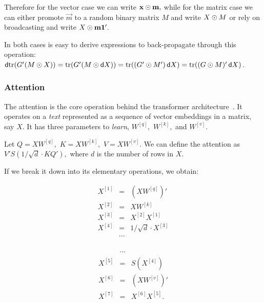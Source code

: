 \documentclass[pdflatex,sn-mathphys-num]{sn-jnl}%
\theoremstyle{thmstyleone}%
\theoremstyle{thmstyletwo}%
\theoremstyle{thmstylethree}%
\begin{document}
Therefore for the vector case we can write \(\mathbf{x} \odot \mathbf{m},\) while for
the matrix case we can either promote \(\vec m\) to a random binary matrix \(M\)
and write \(X \odot M\) or rely on broadcasting and write \(X \odot \mathbf{m}
\mathbf{1}'.\)

In both cases is easy to derive expressions to back-propagate through this operation: \(\mathop{}\!\mathsf d\mathrm{tr}(G' (M \odot X)) = \mathrm{tr}(G' (M \odot \mathop{}\!\mathsf d X)) =
\mathrm{tr}((G' \odot M') \mathop{}\!\mathsf d X) = \mathrm{tr}((G \odot M)' \mathop{}\!\mathsf d X)\).

\subsubsection{Attention}

The attention is the core operation behind the transformer architecture~\cite{vaswani2017}. It operates on a \emph{text} represented as a
sequence of vector embeddings in a matrix, say \(X\). It has three parameters to
 \emph{learn}, \(W^{[q]},\) \(W^{[k]},\) and \(W^{[v]}.\)

Let \(Q = X W^{[q]},\) \(K = X W^{[k]},\) \(V = X W^{[v]}\). We can define the
attention as \(V' S(1 / \sqrt{d} \cdot K Q'),\) where \(d\) is
the number of rows in \(X.\)

If we break it down into its elementary operations, we obtain:

\begin{minipage}{.45\textwidth}
\begin{eqnarray*}
    X^{[1]} &= & (X W^{[q]})' \\
    X^{[2]} &= & X W^{[k]} \\
    X^{[3]} &= & X^{[2]} X^{[1]} \\
    X^{[4]} &= & 1/\sqrt d \cdot X^{[3]} \\
    &\cdots& \\
\end{eqnarray*}
\end{minipage}%
\begin{minipage}{.5\textwidth}
\begin{eqnarray*}
    &\cdots& \\
    X^{[5]} &= & S(X^{[4]}) \\
    X^{[6]} &= & (X W^{[v]})' \\
    X^{[7]} &= & X^{[6]} X^{[5]}. \\
    && \\
\end{eqnarray*}
\end{minipage}
\end{document}
